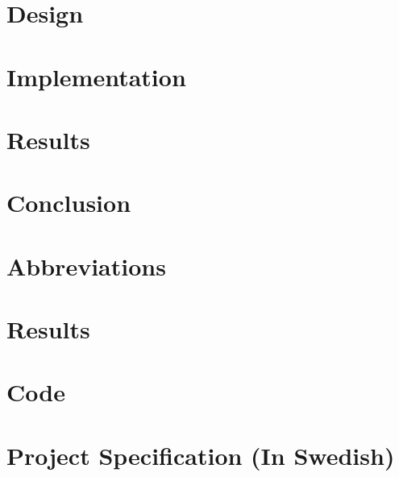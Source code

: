 \documentclass[12pt,twoside]{kau_report}
\begin{document}
\section{Design}
\label{sec:design}

\cleardoublepage

\section{Implementation}
\label{sec:implementation}

\cleardoublepage

\section{Results} %
\label{sec:resultevaluation}

\cleardoublepage

\section{Conclusion}
\label{sec:conclusion}

\cleardoublepage


\begin{singlespace}


\end{singlespace}
\cleardoublepage

\appendix
\section{Abbreviations}
\label{sec:abbreviations}

\cleardoublepage

\section{Results}
\label{app:results}



\cleardoublepage

%


\section{Code}
\cleardoublepage

\section{Project Specification (In Swedish)}
\end{document}
